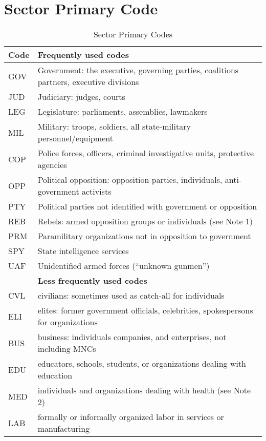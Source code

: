 \documentclass[11pt]{report}
\begin{document}
\section{Sector Primary Code}

\begin{center}
\begin{longtable}{|l|p{13cm}|}
\caption{Sector Primary Codes}
\label{tab:roles}
 \\ \cline{1-2}
  \textbf{Code} & \textbf{Frequently used codes}\\
  \hline
	  GOV & Government: the executive, governing parties, coalitions partners, executive divisions \\ 
	  JUD & Judiciary: judges, courts \\ 
	  LEG & Legislature: parliaments, assemblies, lawmakers \\
	  MIL & Military: troops, soldiers, all state-military personnel/equipment\\ 
	  COP & Police forces, officers, criminal investigative units, protective agencies \\ 
	  OPP & Political opposition: opposition parties, individuals, anti-government activists \\
	  PTY & Political parties not identified with government or opposition \\
	  REB & Rebels: armed opposition groups or individuals (see Note 1)\\ 
	  PRM & Paramilitary organizations not in opposition to government\\ 
	  SPY & State intelligence services \\ 
	  UAF & Unidentified armed forces (``unknown gunmen'') \\ 
  \hline
~   & \textbf{Less frequently used codes}\\
 \hline
	  CVL & civilians: sometimes used as catch-all for individuals \\
	  ELI & elites: former government officials, celebrities, spokespersons for organizations \\
	  BUS & business: individuals companies, and enterprises, not including MNCs \\  
	  EDU & educators, schools, students, or organizations dealing with education \\ 
	  MED & individuals and organizations dealing with health (see Note 2) \\
	  LAB & formally or informally organized labor in services or manufacturing \\

\end{longtable}
\end{center}
\end{document}
